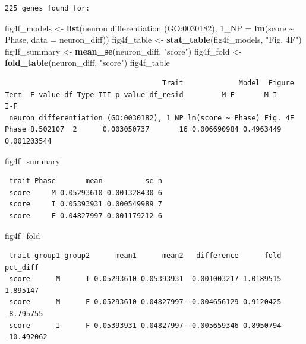 \documentclass[
  landscape]{article}
\newenvironment{Shaded}{\begin{snugshade}}{\end{snugshade}}
\newcommand{\AttributeTok}[1]{\textcolor[rgb]{0.13,0.29,0.53}{#1}}
\newcommand{\FunctionTok}[1]{\textcolor[rgb]{0.13,0.29,0.53}{\textbf{#1}}}
\newcommand{\NormalTok}[1]{#1}
\newcommand{\OtherTok}[1]{\textcolor[rgb]{0.56,0.35,0.01}{#1}}
\newcommand{\SpecialCharTok}[1]{\textcolor[rgb]{0.81,0.36,0.00}{\textbf{#1}}}
\newcommand{\StringTok}[1]{\textcolor[rgb]{0.31,0.60,0.02}{#1}}
\begin{document}
\begin{verbatim}
225 genes found for: 
\end{verbatim}

\begin{Shaded}
\begin{Highlighting}[]
\NormalTok{fig4f\_models }\OtherTok{\textless{}{-}} \FunctionTok{list}\NormalTok{(}\StringTok{\textasciigrave{}}\AttributeTok{neuron differentiation (GO:0030182), 1\_NP}\StringTok{\textasciigrave{}} \OtherTok{=} \FunctionTok{lm}\NormalTok{(score }\SpecialCharTok{\textasciitilde{}}\NormalTok{ Phase, }\AttributeTok{data =}\NormalTok{ neuron\_diff))}
\NormalTok{fig4f\_table }\OtherTok{\textless{}{-}} \FunctionTok{stat\_table}\NormalTok{(fig4f\_models, }\StringTok{"Fig. 4F"}\NormalTok{)}
\NormalTok{fig4f\_summary }\OtherTok{\textless{}{-}} \FunctionTok{mean\_se}\NormalTok{(neuron\_diff, }\StringTok{"score"}\NormalTok{)}
\NormalTok{fig4f\_fold }\OtherTok{\textless{}{-}} \FunctionTok{fold\_table}\NormalTok{(neuron\_diff, }\StringTok{"score"}\NormalTok{)}
\NormalTok{fig4f\_table}
\end{Highlighting}
\end{Shaded}

\begin{verbatim}
                                     Trait             Model  Figure  Term  F value df Type-III p-value df_resid         M-F       M-I         I-F
 neuron differentiation (GO:0030182), 1_NP lm(score ~ Phase) Fig. 4F Phase 8.502107  2      0.003050737       16 0.006690984 0.4963449 0.001203544
\end{verbatim}

\begin{Shaded}
\begin{Highlighting}[]
\NormalTok{fig4f\_summary}
\end{Highlighting}
\end{Shaded}

\begin{verbatim}
 trait Phase       mean          se n
 score     M 0.05293610 0.001328430 6
 score     I 0.05393931 0.000549989 7
 score     F 0.04827997 0.001179212 6
\end{verbatim}

\begin{Shaded}
\begin{Highlighting}[]
\NormalTok{fig4f\_fold}
\end{Highlighting}
\end{Shaded}

\begin{verbatim}
 trait group1 group2      mean1      mean2   difference      fold   pct_diff
 score      M      I 0.05293610 0.05393931  0.001003217 1.0189515   1.895147
 score      M      F 0.05293610 0.04827997 -0.004656129 0.9120425  -8.795755
 score      I      F 0.05393931 0.04827997 -0.005659346 0.8950794 -10.492062
\end{verbatim}
\end{document}

